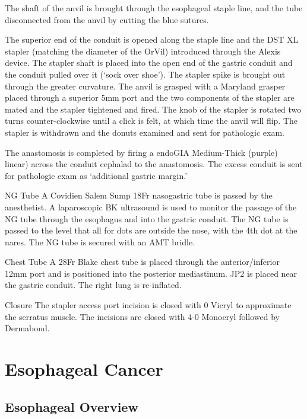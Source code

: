 \documentclass[
]{book}
\begin{document}
The shaft of the anvil is brought through the esophageal staple line, and the tube disconnected from the anvil by cutting the blue sutures.

The superior end of the conduit is opened along the staple line and the DST XL stapler (matching the diameter of the OrVil) introduced through the Alexis device. The stapler shaft is placed into the open end of the gastric conduit and the conduit pulled over it (`sock over shoe'). The stapler spike is brought out through the greater curvature. The anvil is grasped with a Maryland grasper placed through a superior 5mm port and the two components of the stapler are mated and the stapler tightened and fired. The knob of the stapler is rotated two turns counter-clockwise until a click is felt, at which time the anvil will flip. The stapler is withdrawn and the donuts examined and sent for pathologic exam.

The anastomosis is completed by firing a endoGIA Medium-Thick (purple) linear) across the conduit cephalad to the anastomosis. The excess conduit is sent for pathologic exam as `additional gastric margin.'

NG Tube
A Covidien Salem Sump 18Fr nasogastric tube is passed by the anesthetist. A laparoscopic BK ultrasound is used to monitor the passage of the NG tube through the esophagus and into the gastric conduit. The NG tube is passed to the level that all for dots are outside the nose, with the 4th dot at the nares. The NG tube is secured with an AMT bridle.

Chest Tube
A 28Fr Blake chest tube is placed through the anterior/inferior 12mm port and is positioned into the posterior mediastinum. JP2 is placed near the gastric conduit. The right lung is re-inflated.

Closure
The stapler access port incision is closed with 0 Vicryl to approximate the serratus muscle. The incisions are closed with 4-0 Monocryl followed by Dermabond.

\hypertarget{part-esophageal-cancer}{%
\part*{Esophageal Cancer}\label{part-esophageal-cancer}}

\hypertarget{EsoIntro}{%
\chapter{Esophageal Overview}\label{EsoIntro}}
\end{document}
